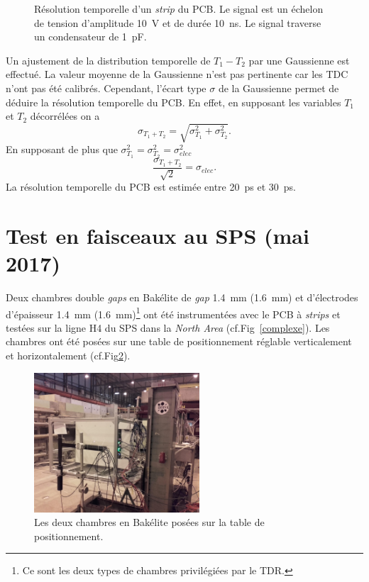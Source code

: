 \begin{figure}[!ht]
	\centering
	\caption{Résolution temporelle d'un \textit{strip} du PCB. Le signal est un échelon de tension d'amplitude \SI{10}{\volt} et de durée \SI{10}{\nano\second}. Le signal traverse un condensateur de \SI{1}{\pico\farad}.}
	\label{RESOLUTION}
\end{figure}

Un ajustement de la distribution temporelle de $T_{1}-T_{2}$ par une Gaussienne est effectué. La valeur moyenne de la Gaussienne n'est pas pertinente car les TDC n'ont pas été calibrés. Cependant, l'écart type $\sigma$ de la Gaussienne permet de déduire la résolution temporelle du PCB. En effet, en supposant les variables $T_1$ et $T_2$ décorrélées on a
\begin{equation}
\sigma_{T_1+T_2}=\sqrt{\sigma_{T_1}^2+\sigma_{T_2}^2}.
\end{equation}
En supposant de plus que $\sigma_{T_1}^2=\sigma_{T_2}^2=\sigma_{elec}^2$
\begin{equation}
\frac{\sigma_{T_1+T_2}}{\sqrt{2}}=\sigma_{elec}.
\end{equation}
La résolution temporelle du PCB est estimée entre \SI{20}{\pico\second} et \SI{30}{\pico\second}.

\section{Test en faisceaux au SPS (mai 2017)}
\label{TIMINGG}
\vspace{-0.4cm}
Deux chambres double \textit{gaps} en Bakélite de \textit{gap} \SI{1.4}{\milli\meter} (\SI{1.6}{\milli\meter}) et d'électrodes d'épaisseur \SI{1.4}{\milli\meter} (\SI{1.6}{\milli\meter})\footnote{Ce sont les deux types de chambres privilégiées par le TDR.} ont été instrumentées avec le PCB à \textit{strips} et testées sur la ligne H4 du SPS dans la \textit{North Area} (cf.Fig~\ref{complexe}). Les chambres ont été posées sur une table de positionnement réglable verticalement et horizontalement (cf.Fig\ref{setup2017}).
\begin{figure}[ht!]
	\centering
	\includegraphics[width=0.55\textwidth]{ELE/setup2017.jpg}
	\captionsetup{type=figure}\caption{Les deux chambres en Bakélite posées sur la table de positionnement.}
	\label{setup2017}
\end{figure}

